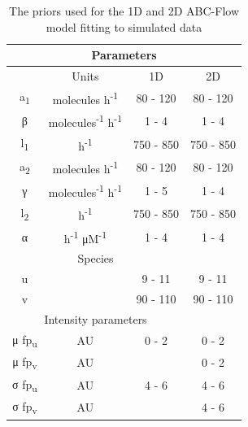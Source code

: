 \begin{table}[tb]
\centering
\caption{The priors used for the 1D and 2D ABC-Flow model fitting to simulated data}
\label{tab:priors_model}

\begin{tabular}{@{}cccc@{}}
\toprule
\multicolumn{4}{c}{Parameters}                                         \\ \midrule
\multicolumn{1}{c}{} & Units  &\multicolumn{1}{c}{1D} & \multicolumn{1}{c}{2D} \\ \midrule
a\textsubscript{1}       &   molecules h\textsuperscript{-1}        & 80 - 120               & 80 - 120               \\
β                   & molecules\textsuperscript{-1} h\textsuperscript{-1} &1 - 4                  & 1 - 4                  \\
l\textsubscript{1}   &    h\textsuperscript{-1}           & 750 - 850              & 750 - 850              \\
a\textsubscript{2}    & molecules h\textsuperscript{-1}               & 80 - 120               & 80 - 120               \\
γ                &molecules\textsuperscript{-1} h\textsuperscript{-1}   & 1 - 5                  & 1 - 4                  \\
l\textsubscript{2}       &    h\textsuperscript{-1}             & 750 - 850              & 750 - 850              \\
α                  &    h\textsuperscript{-1} μM\textsuperscript{-1} & 1 - 4                  & 1 - 4                  \\ \midrule
\multicolumn{3}{c}{Species}                                            \\ \midrule
u                 &   & 9 - 11                 & 9 - 11                 \\
v                 &   & 90 - 110               & 90 - 110               \\ \midrule
\multicolumn{3}{c}{Intensity parameters}                               \\ \midrule
μ fp\textsubscript{u}    &AU         & 0 - 2                  & 0 - 2                  \\
μ fp\textsubscript{v}     &AU        &                   & 0 - 2                  \\
σ fp\textsubscript{u}     &AU       & 4 - 6                  & 4 - 6                  \\
σ fp\textsubscript{v}     &AU       &                   & 4 - 6                  \\ \bottomrule
\end{tabular}

\end{table}




